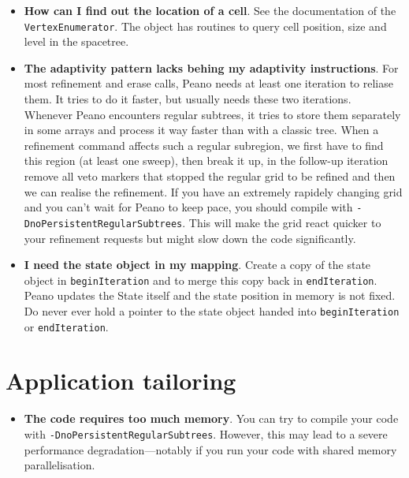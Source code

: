 \begin{itemize}
  \item {\bf How can I find out the location of a cell}. See the documentation
  of the \texttt{VertexEnumerator}. The object has routines to query cell
  position, size and level in the spacetree.
  \item {\bf The adaptivity pattern lacks behing my adaptivity instructions}.
  For most refinement and erase calls, Peano needs at least one iteration to
  reliase them. It tries to do it faster, but usually needs these two
  iterations. Whenever Peano encounters regular subtrees, it tries to store 
  them separately in some arrays and process it way faster than with a classic
  tree. When a refinement command affects such a regular subregion, we first 
  have to find this region (at least one sweep), then break it up, in the
  follow-up iteration remove all veto markers that stopped the regular grid to
  be refined and then we can realise the refinement. If you have an extremely
  rapidely changing grid and you can't wait for Peano to keep pace, you should
  compile with \texttt{-DnoPersistentRegularSubtrees}. This will make the grid
  react quicker to your refinement requests but might slow down the code
  significantly.
  \item {\bf I need the state object in my mapping}. Create a copy of the state
  object in \texttt{beginIteration} and to merge this copy back in \texttt{endIteration}. 
  Peano updates the State itself and the state position in memory is not fixed.
  Do never ever hold a pointer to the state object handed into
  \texttt{beginIteration} or \texttt{endIteration}.
\end{itemize}


\section{Application tailoring}

\begin{itemize}
  \item {\bf The code requires too much memory}.
  You can try to compile your code with \texttt{-DnoPersistentRegularSubtrees}.
  However, this may lead to a severe performance degradation---notably if you
  run your code with shared memory parallelisation.
\end{itemize}
